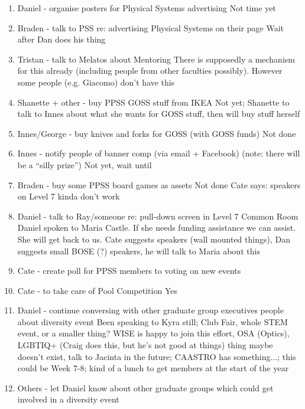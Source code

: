\documentclass[a4paper,11pt]{article}
\begin{document}
\begin{enumerate}
\item Daniel - organise posters for Physical Systems advertising
Not time yet

\item Braden - talk to PSS re: advertising Physical Systems on their page
Wait after Dan does his thing

\item Tristan - talk to Melatos about Mentoring
There is supposedly a mechanism for this already (including people from other faculties possibly). However some people (e.g. Giacomo) don't have this

\item Shanette + other - buy PPSS GOSS stuff from IKEA
Not yet; Shanette to talk to Innes about what she wants for GOSS stuff, then will buy stuff herself

\item Innes/George - buy knives and forks for GOSS (with GOSS funds)
Not done

\item Innes - notify people of banner comp (via email + Facebook) (note: there will be a ``silly prize'')
Not yet, wait until 

\item Braden - buy some PPSS board games as assets
Not done
Cate says: speakers on Level 7 kinda don't work 

\item Daniel - talk to Ray/someone re: pull-down screen in Level 7 Common Room
Daniel spoken to Maria Castle. If she needs funding assistance we can assist. She will get back to us. Cate suggests speakers (wall mounted things), Dan suggests small BOSE (?) speakers, he will talk to Maria about this

\item Cate - create poll for PPSS members to voting on new events


\item Cate - to take care of Pool Competition
Yes

\item Daniel - continue conversing with other graduate group executives people about diversity event
Been speaking to Kyra still; Club Fair, whole STEM event, or a smaller thing? WISE is happy to join this effort, OSA (Optics), LGBTIQ+ (Craig does this, but he's not good at things) thing maybe doesn't exist, talk to Jacinta in the future; CAASTRO has something...; this could be Week 7-8; kind of a lunch to get members at the start of the year

\item Others - let Daniel know about other graduate groups which could get involved in a diversity event



\end{enumerate}
\end{document}
